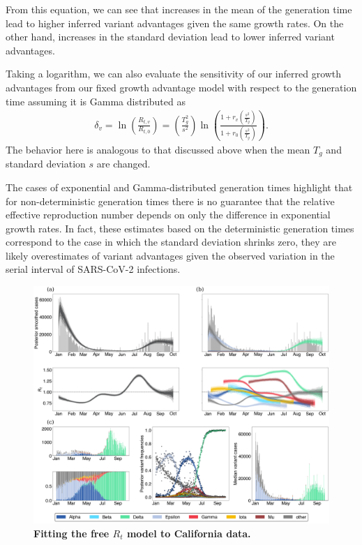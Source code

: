 \documentclass[11pt,oneside,letterpaper]{article}
\begin{document}
From this equation, we can see that increases in the mean of the generation time lead to higher inferred variant advantages given the same growth rates. On the other hand, increases in the standard deviation lead to lower inferred variant advantages.

Taking a logarithm, we can also evaluate the sensitivity of our inferred growth advantages from our fixed growth advantage model with respect to the generation time assuming it is Gamma distributed as
\begin{align*}
 \delta_{v}  = \ln \left( \frac{R_{t,v}}{R_{t,0}} \right) = \left( \frac{T_{g}^{2}}{s^{2}} \right)  \ln \left( \frac{1 + r_{v}  \left(\frac{s^{2}}{T_{g}}\right)}{1 + r_{0} \left(\frac{s^{2}}{T_{g}}\right) } \right).
\end{align*}
The behavior here is analogous to that discussed above when the mean $T_{g}$ and standard deviation $s$ are changed.

The cases of exponential and Gamma-distributed generation times highlight that for non-deterministic generation times there is no guarantee that the relative effective reproduction number depends on only the difference in exponential growth rates.
In fact, these estimates based on the deterministic generation times correspond to the case in which the standard deviation shrinks zero, they are likely overestimates of variant advantages given the observed variation in the serial interval of SARS-CoV-2 infections.

\begin{figure}
  \centering
  \includegraphics[width=\linewidth]{figs/free_rt_California.png}
  \caption{\textbf{Fitting the free $R_{t}$ model to California data.}}%
  \label{fig:free_rt_California}
\end{figure}
\end{document}
